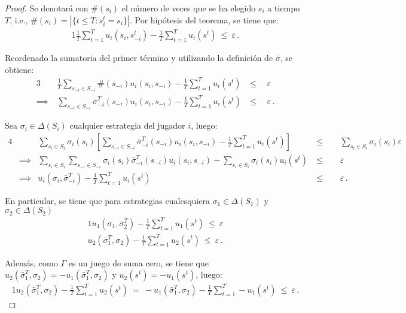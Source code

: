 \begin{proof}
Se denotará con $\#(s_i)$ el número de veces que se ha elegido $s_i$ a tiempo $T$, i.e., $\#(s_i) = |\{ t \leq T : s_i^t = s_i\}|$. Por hipótesis del teorema, se tiene que:
\begin{alignat}{1}
\frac{1}{T} \sum_{t = 1}^T u_i(s_i, s_{-i}^t) - \frac{1}{T} \sum_{t = 1}^T u_i(s^t)\ \leq\ \varepsilon \,.
\end{alignat}

Reordenado la sumatoria del primer término y utilizando la definición de $\bar\sigma$, se obtiene:
\begin{alignat}{3}
& \frac{1}{T} \sum_{s_{-i} \in S_{-i}} \#(s_{-i})u_i(s_i, s_{-i}) - \frac{1}{T} \sum_{t = 1}^Tu_i(s^t)\ & \leq\ & \ \varepsilon \\
\implies\ & \sum_{s_{-i} \in S_{-i}} \bar{\sigma}_{-i}^T(s_{-i})u_i(s_i, s_{-i}) - \frac{1}{T} \sum_{t = 1}^T u_i(s^t)\ & \leq\ & \ \varepsilon \,.
\end{alignat}

Sea $\sigma_i \in \Delta(S_i)$ cualquier estrategia del jugador $i$, luego:
\begin{alignat}{4}
& & \sum_{s_i \in S_i} \sigma_i(s_i) \left[ \sum_{s_{-i} \in S_{-i}} \bar{\sigma}_{-i}^T(s_{-i})u_i(s_i, s_{-i}) - \frac{1}{T} \sum_{t = 1}^T u_i(s^t) \right]\ & \leq\  & & \ \sum_{s_i \in S_i} \sigma_i(s_i) \varepsilon \\
& \implies & \sum_{s_i \in S_i} \sum_{s_{-i} \in S_{-i}} \sigma_i(s_i)\bar{\sigma}_{-i}^T(s_{-i}) u_i(s_i, s_{-i}) - \sum_{s_i \in S_i} \sigma_i(s_i)u_i(s^t)\ & \leq\  & & \ \varepsilon \\
& \implies & u_i(\sigma_i, \bar{\sigma}_{-i}^T) - \frac{1}{T} \sum_{t = 1}^T u_i(s^t)\ & \leq\ &  & \ \varepsilon \,.
\end{alignat}

En particular, se tiene que para estrategias cualesquiera $\sigma_1 \in \Delta(S_1)$ y $\sigma_2 \in \Delta(S_2)$
\begin{alignat}{1}
\label{eq:star1}
u_1(\sigma_1, \bar{\sigma}_2^T) - \frac{1}{T} \sum_{t=1}^T u_1(s^t)\ \leq\ \varepsilon \\
u_2(\bar{\sigma}_1^T, \sigma_2) - \frac{1}{T} \sum_{t=1}^T u_2(s^t)\ \leq\ \varepsilon \,.
\end{alignat}

Además, como $\Gamma$ es un juego de suma cero, se tiene que $u_2(\bar{\sigma}_1^T, \sigma_2) = -u_1(\bar{\sigma}_1^T, \sigma_2)$ y $u_2(s^t) = -u_1(s^t)$, luego:
\begin{alignat}{1}
u_2(\bar{\sigma}_1^T, \sigma_2) - \frac{1}{T} \sum_{t=1}^T u_2(s^t)\ =\ -u_1(\bar{\sigma}_1^T, \sigma_2) - \frac{1}{T} \sum_{t=1}^T -u_1(s^t)\ \leq\ \varepsilon \,.
\end{alignat}


\end{proof}
